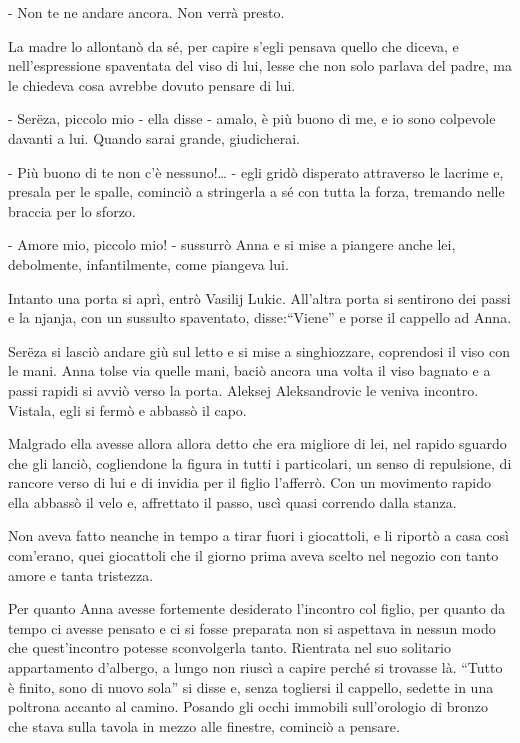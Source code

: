 - Non te ne andare ancora. Non verrà presto. 

La madre lo allontanò da sé, per capire s'egli pensava quello che diceva, e nell'espressione spaventata del viso di lui, lesse che non solo parlava del padre, ma le chiedeva cosa avrebbe dovuto pensare di lui. 

- Serëza, piccolo mio - ella disse - amalo, è più buono di me, e io sono colpevole davanti a lui. Quando sarai grande, giudicherai. 

- Più buono di te non c'è nessuno!\ldots{} - egli gridò disperato attraverso le lacrime e, presala per le spalle, cominciò a stringerla a sé con tutta la forza, tremando nelle braccia per lo sforzo. 

- Amore mio, piccolo mio! - sussurrò Anna e si mise a piangere anche lei, debolmente, infantilmente, come piangeva lui. 

Intanto una porta si aprì, entrò Vasilij Lukic. All'altra porta si sentirono dei passi e la njanja, con un sussulto spaventato, disse:``Viene'' e porse il cappello ad Anna. 

Serëza si lasciò andare giù sul letto e si mise a singhiozzare, coprendosi il viso con le mani. Anna tolse via quelle mani, baciò ancora una volta il viso bagnato e a passi rapidi si avviò verso la porta. Aleksej Aleksandrovic le veniva incontro. Vistala, egli si fermò e abbassò il capo. 

Malgrado ella avesse allora allora detto che era migliore di lei, nel rapido sguardo che gli lanciò, cogliendone la figura in tutti i particolari, un senso di repulsione, di rancore verso di lui e di invidia per il figlio l'afferrò. Con un movimento rapido ella abbassò il velo e, affrettato il passo, uscì quasi correndo dalla stanza. 

Non aveva fatto neanche in tempo a tirar fuori i giocattoli, e li riportò a casa così com'erano, quei giocattoli che il giorno prima aveva scelto nel negozio con tanto amore e tanta tristezza. 

\label{xxxi-3} 

Per quanto Anna avesse fortemente desiderato l'incontro col figlio, per quanto da tempo ci avesse pensato e ci si fosse preparata non si aspettava in nessun modo che quest'incontro potesse sconvolgerla tanto. Rientrata nel suo solitario appartamento d'albergo, a lungo non riuscì a capire perché si trovasse là. ``Tutto è finito, sono di nuovo sola'' si disse e, senza togliersi il cappello, sedette in una poltrona accanto al camino. Posando gli occhi immobili sull'orologio di bronzo che stava sulla tavola in mezzo alle finestre, cominciò a pensare. 

